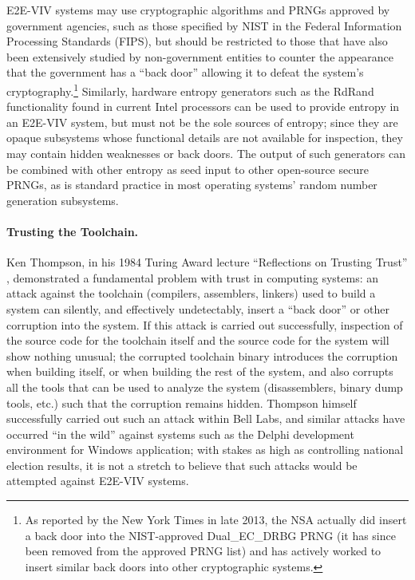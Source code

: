 E2E-VIV systems may use cryptographic algorithms and PRNGs approved by
government agencies, such as those specified by NIST in the Federal
Information Processing Standards (FIPS), but should be restricted to
those that have also been extensively studied by non-government
entities to counter the appearance that the government has a ``back
door'' allowing it to defeat the system's cryptography.\footnote{As
  reported by the New York Times in late 2013, the NSA actually did
  insert a back door into the NIST-approved Dual\_EC\_DRBG PRNG (it
  has since been removed from the approved PRNG list) and has actively
  worked to insert similar back doors into other cryptographic
  systems.}  Similarly, hardware entropy generators such as the RdRand
functionality found in current Intel processors can be used to provide
entropy in an E2E-VIV system, but must not be the sole sources of
entropy; since they are opaque subsystems whose functional details are
not available for inspection, they may contain hidden weaknesses or
back doors. The output of such generators can be combined with other
entropy as seed input to other open-source secure PRNGs, as is
standard practice in most operating systems' random number generation
subsystems.

\paragraph{Trusting the Toolchain.} Ken Thompson, in his 1984 Turing
Award lecture ``Reflections on Trusting Trust'' \cite{Thompson84},
demonstrated a fundamental problem with trust in computing systems: an
attack against the toolchain (compilers, assemblers, linkers) used to
build a system can silently, and effectively undetectably, insert a
``back door'' or other corruption into the system. If this attack is
carried out successfully, inspection of the source code for the
toolchain itself and the source code for the system will show nothing
unusual; the corrupted toolchain binary introduces the corruption when
building itself, or when building the rest of the system, and also
corrupts all the tools that can be used to analyze the system
(disassemblers, binary dump tools, etc.) such that the corruption
remains hidden. Thompson himself successfully carried out such an
attack within Bell Labs, and similar attacks have occurred ``in the
wild'' against systems such as the Delphi development environment for
Windows application; with stakes as high as controlling national
election results, it is not a stretch to believe that such attacks
would be attempted against E2E-VIV systems.

